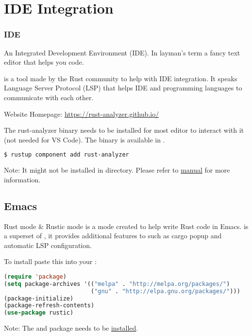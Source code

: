 \documentclass{beamer}
\begin{document}
\section{IDE Integration}
\begin{frame}[fragile]
  \frametitle{IDE}
  An Integrated Development Environment (IDE). In layman's term a fancy text editor that helps you code.

   is a tool made by the Rust community to help with IDE integration. It speaks Language Server Protocol (LSP) that helps IDE and programming languages to communicate with each other.

  Website Homepage: \url{https://rust-analyzer.github.io/}

  The rust-analyzer binary needs to be installed for most editor to interact with it (not needed for VS Code). The binary is available in .
\begin{lstlisting}[language=bash]
$ rustup component add rust-analyzer
\end{lstlisting}

  \alert{Note:} It might not be installed in  directory. Please refer to  \href{https://rust-analyzer.github.io/manual.html}{manual} for more information.
\end{frame}

\subsection{Emacs}

\begin{frame}[fragile]{Rust mode \& Rustic mode}
   is a mode created to help write Rust code in Emacs.  is a superset of , it provides additional features to  such as cargo popup and automatic LSP configuration.

  To install paste this into your :
\begin{lstlisting}[language=Lisp]
(require 'package)
(setq package-archives '(("melpa" . "http://melpa.org/packages/")
                         ("gnu" . "http://elpa.gnu.org/packages/")))
(package-initialize)
(package-refresh-contents)
(use-package rustic)
\end{lstlisting}

  \alert{Note:} The  and  package needs to be \href{https://www.emacswiki.org/emacs/InstallingPackages}{installed}.
\end{frame}
\end{document}
